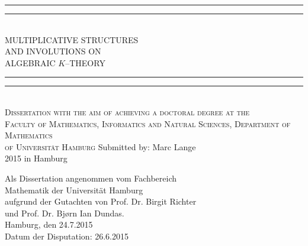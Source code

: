 \documentclass[12pt,bibliography=totoc,final]{scrbook} %
\date{\the\day.\the\month.\the\year}
\newcommand*{\titleGP}{\begingroup %
\thispagestyle{empty}\clearpage\thispagestyle{empty}\clearpage

\begin{center} %
\vspace*{\baselineskip} %

\rule{\textwidth}{1.6pt}\vspace*{-\baselineskip}\vspace*{2pt} %
\rule{\textwidth}{0.4pt}\\[\baselineskip] %

{\LARGE MULTIPLICATIVE STRUCTURES\\ AND INVOLUTIONS ON \\[0.3\baselineskip] ALGEBRAIC $K$--THEORY}\\[\baselineskip] %

\rule{\textwidth}{0.4pt}\vspace*{-\baselineskip}\vspace{3.2pt} %
\rule{\textwidth}{1.6pt}\\[\baselineskip] %

{{\scshape %
Dissertation with the aim of achieving a doctoral degree
at the \\ Faculty of Mathematics, Informatics and Natural Sciences,
Department of Mathematics \\%
of Universit{\"a}t Hamburg \vfill}
Submitted by: Marc Lange \\ 
{2015} in Hamburg}

\end{center}
\endgroup}
\begin{document}
\pagestyle{empty}\titleGP \null\newpage \null\vfill Als Dissertation angenommen vom Fachbereich \\
Mathematik der Universit\"at Hamburg\\[2em] aufgrund der Gutachten von Prof. Dr. Birgit Richter\\
\phantom{aufgrund der Gutachten} und Prof. Dr. Bj\o rn Ian Dundas.\\[2em]

Hamburg, den 24.7.2015 \\
Datum der Disputation: 26.6.2015 \newpage\clearpage \par\vspace*{.35\textheight}{\centering To Cedric\par} \newpage
 \tableofcontents\thispagestyle{empty}   %
\end{document}
